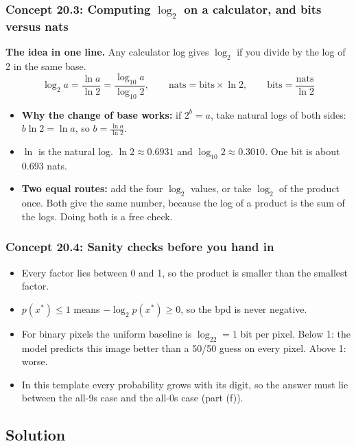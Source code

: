 \documentclass[12pt,a4paper]{article}
\begin{document}
\subsubsection{Concept 20.3: Computing $\log_2$ on a calculator, and bits versus nats}\label{c20-3}

\textbf{The idea in one line.} Any calculator log gives $\log_2$ if you divide by the log of 2 in the same base.
\[
\log_2a=\frac{\ln a}{\ln 2}=\frac{\log_{10}a}{\log_{10}2},\qquad \text{nats}=\text{bits}\times\ln2,\qquad \text{bits}=\frac{\text{nats}}{\ln 2}
\]
\begin{itemize}[nosep]
  \item \textbf{Why the change of base works:} if $2^b=a$, take natural logs of both sides: $b\ln2=\ln a$, so $b=\frac{\ln a}{\ln2}$.
  \item $\ln$ is the natural log. $\ln2\approx0.6931$ and $\log_{10}2\approx0.3010$. One bit is about 0.693 nats.
  \item \textbf{Two equal routes:} add the four $\log_2$ values, or take $\log_2$ of the product once. Both give the same number, because the log of a product is the sum of the logs. Doing both is a free check.
\end{itemize}

\subsubsection{Concept 20.4: Sanity checks before you hand in}\label{c20-4}

\begin{itemize}[nosep]
  \item Every factor lies between 0 and 1, so the product is smaller than the smallest factor.
  \item $p(x^*)\le1$ means $-\log_2p(x^*)\ge0$, so the bpd is never negative.
  \item For binary pixels the uniform baseline is $\log_22=1$ bit per pixel. Below 1: the model predicts this image better than a 50/50 guess on every pixel. Above 1: worse.
  \item In this template every probability grows with its digit, so the answer must lie between the all-9s case and the all-0s case (part (f)).
\end{itemize}

\subsection{Solution}
\end{document}
